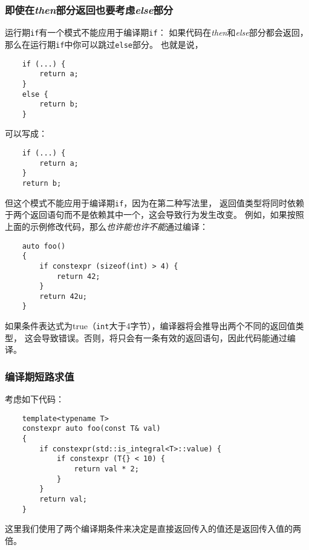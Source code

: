 \subsubsection*{即使在\emph{then}部分返回也要考虑\emph{else}部分}
运行期\texttt{if}有一个模式不能应用于编译期\texttt{if}：
如果代码在\emph{then}和\emph{else}部分都会返回，
那么在运行期\texttt{if}中你可以跳过\texttt{else}部分。
也就是说，
\begin{lstlisting}
    if (...) {
        return a;
    }
    else {
        return b;
    }
\end{lstlisting}
可以写成：
\begin{lstlisting}
    if (...) {
        return a;
    }
    return b;
\end{lstlisting}
但这个模式不能应用于编译期\texttt{if}，因为在第二种写法里，
返回值类型将同时依赖于两个返回语句而不是依赖其中一个，这会导致行为发生改变。
例如，如果按照上面的示例修改代码，那么\emph{也许能也许不能}通过编译：
\begin{lstlisting}
    auto foo()
    {
        if constexpr (sizeof(int) > 4) {
            return 42;
        }
        return 42u;
    }
\end{lstlisting}
如果条件表达式为true（\texttt{int}大于4字节），编译器将会推导出两个不同的返回值类型，
这会导致错误。否则，将只会有一条有效的返回语句，因此代码能通过编译。

\subsubsection*{编译期短路求值}
考虑如下代码：
\begin{lstlisting}
    template<typename T>
    constexpr auto foo(const T& val)
    {
        if constexpr(std::is_integral<T>::value) {
            if constexpr (T{} < 10) {
                return val * 2;
            }
        }
        return val;
    }
\end{lstlisting}
这里我们使用了两个编译期条件来决定是直接返回传入的值还是返回传入值的两倍。

